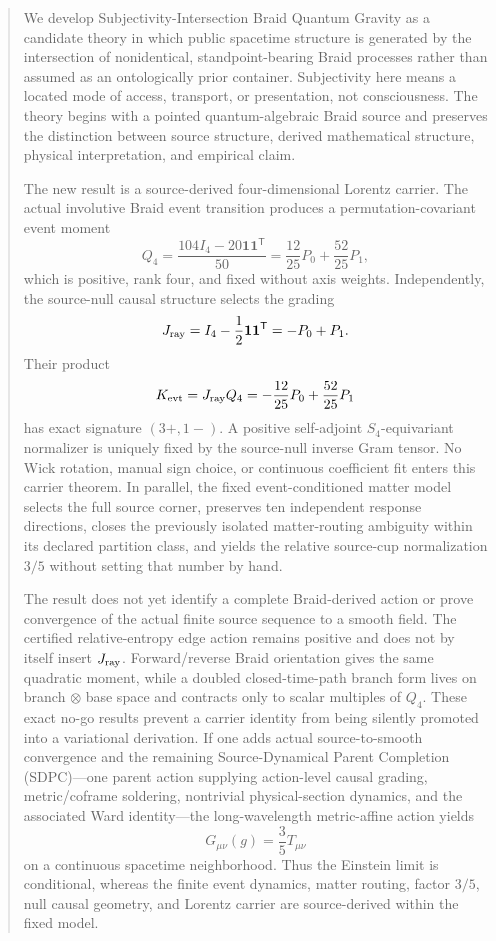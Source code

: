\documentclass[11pt]{article}
\theoremstyle{definition}
\theoremstyle{remark}
\begin{document}
\begin{abstract}
We develop Subjectivity-Intersection Braid Quantum Gravity as a candidate theory in which public spacetime structure is generated by the intersection of nonidentical, standpoint-bearing Braid processes rather than assumed as an ontologically prior container. Subjectivity here means a located mode of access, transport, or presentation, not consciousness. The theory begins with a pointed quantum-algebraic Braid source and preserves the distinction between source structure, derived mathematical structure, physical interpretation, and empirical claim.

The new result is a source-derived four-dimensional Lorentz carrier. The actual involutive Braid event transition produces a permutation-covariant event moment
\[
 Q_4=\frac{104I_4-20\mathbf1\mathbf1^{\mathsf T}}{50}
     =\frac{12}{25}P_0+\frac{52}{25}P_1,
\]
which is positive, rank four, and fixed without axis weights. Independently, the source-null causal structure selects the grading
\[
 J_{\rm ray}=I_4-\frac12\mathbf1\mathbf1^{\mathsf T}=-P_0+P_1.
\]
Their product
\[
 K_{\rm evt}=J_{\rm ray}Q_4
 =-\frac{12}{25}P_0+\frac{52}{25}P_1
\]
has exact signature $(3+,1-)$. A positive self-adjoint $S_4$-equivariant normalizer is uniquely fixed by the source-null inverse Gram tensor. No Wick rotation, manual sign choice, or continuous coefficient fit enters this carrier theorem. In parallel, the fixed event-conditioned matter model selects the full source corner, preserves ten independent response directions, closes the previously isolated matter-routing ambiguity within its declared partition class, and yields the relative source-cup normalization $3/5$ without setting that number by hand.

The result does not yet identify a complete Braid-derived action or prove convergence of the actual finite source sequence to a smooth field. The certified relative-entropy edge action remains positive and does not by itself insert $J_{\rm ray}$. Forward/reverse Braid orientation gives the same quadratic moment, while a doubled closed-time-path branch form lives on branch $\otimes$ base space and contracts only to scalar multiples of $Q_4$. These exact no-go results prevent a carrier identity from being silently promoted into a variational derivation. If one adds actual source-to-smooth convergence and the remaining Source-Dynamical Parent Completion (SDPC)---one parent action supplying action-level causal grading, metric/coframe soldering, nontrivial physical-section dynamics, and the associated Ward identity---the long-wavelength metric-affine action yields
\[
 G_{\mu\nu}(g)=\frac35T_{\mu\nu}
\]
on a continuous spacetime neighborhood. Thus the Einstein limit is conditional, whereas the finite event dynamics, matter routing, factor $3/5$, null causal geometry, and Lorentz carrier are source-derived within the fixed model.


\end{abstract}
\end{document}
